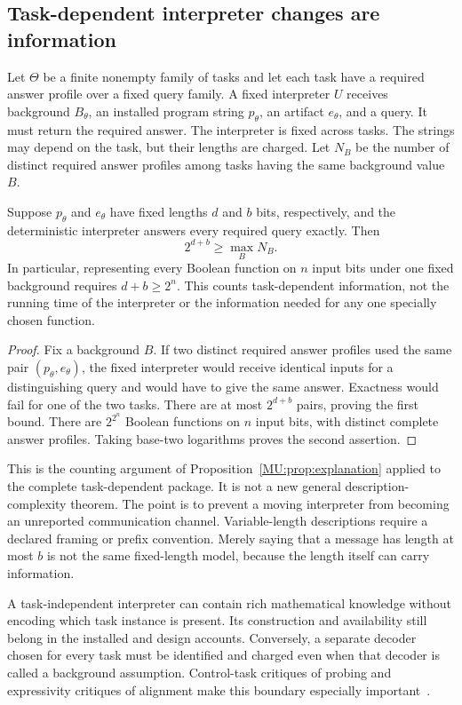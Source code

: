 \subsection{Task-dependent interpreter changes are information}
Let $\Theta$ be a finite nonempty family of tasks and let each task have a required answer profile over a fixed query family. A fixed interpreter $U$ receives background $B_\theta$, an installed program string $p_\theta$, an artifact $e_\theta$, and a query. It must return the required answer. The interpreter is fixed across tasks. The strings may depend on the task, but their lengths are charged. Let $N_B$ be the number of distinct required answer profiles among tasks having the same background value $B$.

\begin{MUproposition}\label{MU:prop:advice}
Suppose $p_\theta$ and $e_\theta$ have fixed lengths $d$ and $b$ bits, respectively, and the deterministic interpreter answers every required query exactly. Then
\[
2^{d+b}\geq\max_B N_B.
\]
In particular, representing every Boolean function on $n$ input bits under one fixed background requires $d+b\geq2^n$. This counts task-dependent information, not the running time of the interpreter or the information needed for any one specially chosen function.
\end{MUproposition}
\begin{proof}
Fix a background $B$. If two distinct required answer profiles used the same pair $(p_\theta,e_\theta)$, the fixed interpreter would receive identical inputs for a distinguishing query and would have to give the same answer. Exactness would fail for one of the two tasks. There are at most $2^{d+b}$ pairs, proving the first bound. There are $2^{2^n}$ Boolean functions on $n$ input bits, with distinct complete answer profiles. Taking base-two logarithms proves the second assertion.
\end{proof}

This is the counting argument of Proposition~\ref{MU:prop:explanation} applied to the complete task-dependent package. It is not a new general description-complexity theorem. The point is to prevent a moving interpreter from becoming an unreported communication channel. Variable-length descriptions require a declared framing or prefix convention. Merely saying that a message has length at most $b$ is not the same fixed-length model, because the length itself can carry information.

A task-independent interpreter can contain rich mathematical knowledge without encoding which task instance is present. Its construction and availability still belong in the installed and design accounts. Conversely, a separate decoder chosen for every task must be identified and charged even when that decoder is called a background assumption. Control-task critiques of probing and expressivity critiques of alignment make this boundary especially important~\cite{MU:hewitt,MU:sutter}.

